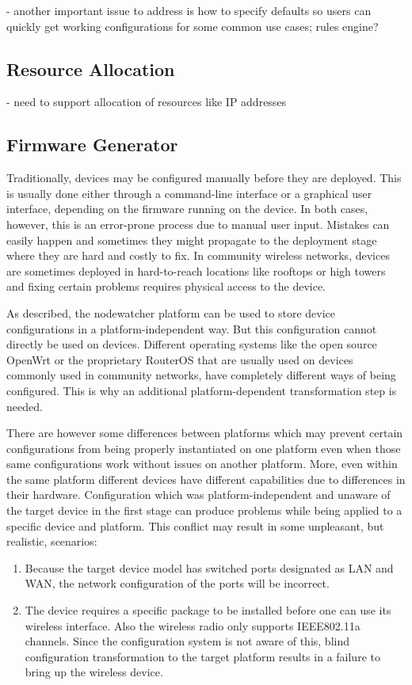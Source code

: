 \documentclass[5p,sort&compress]{elsarticle}
\begin{document}
- another important issue to address is how to specify defaults so users can quickly get working configurations for some common use cases; rules engine?

\subsection{Resource Allocation}

- need to support allocation of resources like IP addresses

\subsection{Firmware Generator}
\label{sec:firmware-generator}

Traditionally, devices may be configured manually before they are deployed.
This is usually done either through a command-line interface or a graphical user interface, depending on the firmware running on the device.
In both cases, however, this is an error-prone process due to manual user input.
Mistakes can easily happen and sometimes they might propagate to the deployment stage where they are hard and costly to fix.
In community wireless networks, devices are sometimes deployed in hard-to-reach locations like rooftops or high towers and fixing certain problems requires physical access to the device.

As described, the nodewatcher platform can be used to store device configurations in a platform-independent way.
But this configuration cannot directly be used on devices.
Different operating systems like the open source OpenWrt or the proprietary RouterOS that are usually used on devices commonly used in community networks, have completely different ways of being configured.
This is why an additional platform-dependent transformation step is needed.

There are however some differences between platforms which may prevent certain configurations from being properly instantiated on one platform even when those same configurations work without issues on another platform.
More, even within the same platform different devices have different capabilities due to differences in their hardware.
Configuration which was platform-independent and unaware of the target device in the first stage can produce problems while being applied to a specific device and platform.
This conflict may result in some unpleasant, but realistic, scenarios:
\begin{enumerate}[label=\roman*)]
\item Because the target device model has switched ports designated as LAN and WAN, the network configuration of the ports will be incorrect.

\item The device requires a specific package to be installed before one can use its wireless interface.
Also the wireless radio only supports IEEE802.11a channels.
Since the configuration system is not aware of this, blind configuration transformation to the target platform results in a failure to bring up the wireless device.

\end{enumerate}
\end{document}
